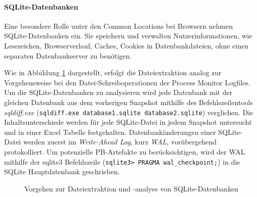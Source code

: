 \paragraph*{SQLite-Datenbanken}
\label{subsubsection:methodik-datenanalyse-commonlocations-sqlitedbs}
Eine besondere Rolle unter den Common Locations bei Browsern nehmen SQLite-Datenbanken ein. 
Sie speichern und verwalten Nutzerinformationen, wie Lesezeichen, Browserverlauf, Caches, Cookies in Datenbankdateien, ohne einen separaten Datenbankserver zu benötigen.

Wie in Abbildung \ref{img:dateiextraktion-und-analyse-sqlite} dargestellt, erfolgt die Dateiextraktion analog zur Vorgehensweise bei den Datei-Schreiboperationen der Process Monitor Logfiles. Um die SQLite-Datenbanken zu analysieren wird jede Datenbank mit der gleichen Datenbank aus dem vorherigen Snapshot mithilfe des Befehlszeilentools \textit{sqldiff.exe} (\texttt{sqldiff.exe database1.sqlite database2.sqlite}) verglichen. Die Inhaltsunterschiede werden für jede SQLite-Datei in jedem Snapshot untersucht und in einer Excel Tabelle festgehalten.
Datenbankänderungen einer SQLite-Datei werden zuerst im \textit{Write-Ahead Log}, kurz \textit{WAL}, vorübergehend protokolliert. 
Um potenzielle PB-Artefakte zu berücksichtigen, wird der WAL mithilfe der sqlite3 Befehlszeile (\texttt{sqlite3> PRAGMA wal\_checkpoint;}) in die SQLite Hauptdatenbank geschrieben.
\begin{figure}[h!]
	\centering
	\small
	\centerline{\resizebox{\linewidth}{!}{}}
	\caption{Vorgehen zur Dateiextraktion und -analyse von SQLite-Datenbanken}
	\label{img:dateiextraktion-und-analyse-sqlite}
\end{figure}

